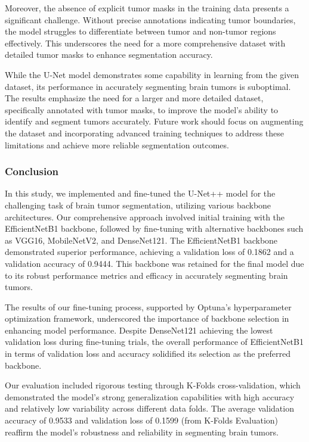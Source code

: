 Moreover, the absence of explicit tumor masks in the training data presents a significant challenge. Without precise annotations indicating tumor boundaries, the model struggles to differentiate between tumor and non-tumor regions effectively. This underscores the need for a more comprehensive dataset with detailed tumor masks to enhance segmentation accuracy.

While the U-Net model demonstrates some capability in learning from the given dataset, its performance in accurately segmenting brain tumors is suboptimal. The results emphasize the need for a larger and more detailed dataset, specifically annotated with tumor masks, to improve the model's ability to identify and segment tumors accurately. Future work should focus on augmenting the dataset and incorporating advanced training techniques to address these limitations and achieve more reliable segmentation outcomes.

\subsubsection{Conclusion}\label{s:conclusion}

In this study, we implemented and fine-tuned the U-Net++ model for the challenging task of brain tumor segmentation, utilizing various backbone architectures. Our comprehensive approach involved initial training with the EfficientNetB1 backbone, followed by fine-tuning with alternative backbones such as VGG16, MobileNetV2, and DenseNet121. The EfficientNetB1 backbone demonstrated superior performance, achieving a validation loss of 0.1862 and a validation accuracy of 0.9444. This backbone was retained for the final model due to its robust performance metrics and efficacy in accurately segmenting brain tumors.

The results of our fine-tuning process, supported by Optuna's hyperparameter optimization framework, underscored the importance of backbone selection in enhancing model performance. Despite DenseNet121 achieving the lowest validation loss during fine-tuning trials, the overall performance of EfficientNetB1 in terms of validation loss and accuracy solidified its selection as the preferred backbone.

Our evaluation included rigorous testing through K-Folds cross-validation, which demonstrated the model's strong generalization capabilities with high accuracy and relatively low variability across different data folds. The average validation accuracy of 0.9533 and validation loss of 0.1599 (from K-Folds Evaluation) reaffirm the model's robustness and reliability in segmenting brain tumors.

